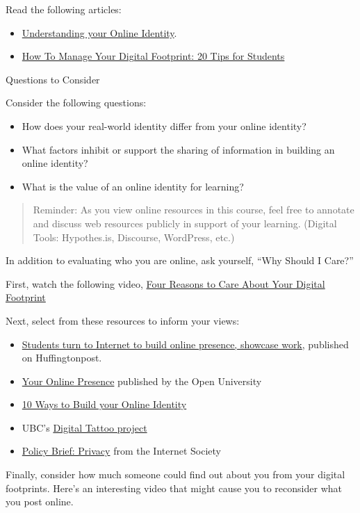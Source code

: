 \documentclass[
]{book}
\providecommand{\tightlist}{%
  \setlength{\itemsep}{0pt}\setlength{\parskip}{0pt}}
\theoremstyle{definition}
\theoremstyle{definition}
\theoremstyle{definition}
\theoremstyle{definition}
\theoremstyle{remark}
\begin{document}
\begin{reflect}
Read the following articles:

\begin{itemize}
\tightlist
\item
  \href{assets/u4/U4_Understanding-your-Online-Identity-An-Overview-of-Identity.pdf}{Understanding your Online Identity}.
\item
  \href{https://research.com/education/how-to-manage-digital-footprint}{How To Manage Your Digital Footprint: 20 Tips for Students}
\end{itemize}

{Questions to Consider}

Consider the following questions:

\begin{itemize}
\tightlist
\item
  How does your real-world identity differ from your online identity?\\
\item
  What factors inhibit or support the sharing of information in building an online identity?\\
\item
  What is the value of an online identity for learning?
\end{itemize}

\begin{quote}
Reminder: As you view online resources in this course, feel free to annotate and discuss web resources publicly in support of your learning. (Digital Tools: Hypothes.is, Discourse, WordPress, etc.)
\end{quote}

In addition to evaluating who you are online, ask yourself, ``Why Should I Care?''

First, watch the following video, \href{https://www.youtube.com/watch?v=Ro_LlRg8rGg}{Four Reasons to Care About Your Digital Footprint}

Next, select from these resources to inform your views:

\begin{itemize}
\tightlist
\item
  \href{https://www.huffpost.com/entry/students-turn-to-internet_b_3518598}{Students turn to Internet to build online presence, showcase work}, published on Huffingtonpost.
\item
  \href{https://help.open.ac.uk/your-online-presence}{Your Online Presence} published by the Open University
\item
  \href{https://www.careercast.com/career-news/10-ways-build-your-online-identity}{10 Ways to Build your Online Identity}
\item
  UBC's \href{https://digitaltattoo.ubc.ca/}{Digital Tattoo project}
\item
  \href{https://www.internetsociety.org/policybriefs/privacy/}{Policy Brief: Privacy} from the Internet Society
\end{itemize}

Finally, consider how much someone could find out about you from your digital footprints. Here's an interesting video that might cause you to reconsider what you post online.
\end{reflect}
\end{document}
